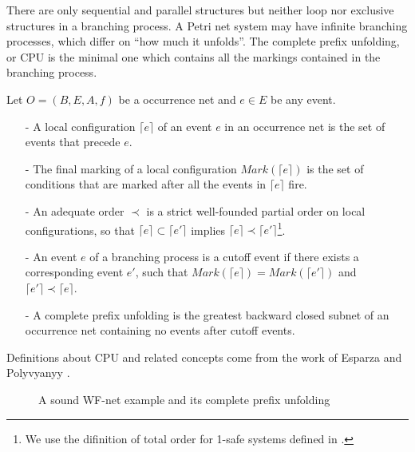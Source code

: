 \documentclass[dvips,...]{llncs}
\begin{document}
There are only sequential and parallel structures but neither loop nor exclusive structures in a branching process. A Petri net system may have infinite branching processes, which differ on ``how much it unfolds''. The complete prefix unfolding, or CPU is the minimal one which contains all the markings contained in the branching process.

\begin{definition}\label{def:cpu}
Let $O=(B,E,A,f)$ be a occurrence net and $e\in E$ be any event.
	\begin{itemize}
		\item[-] A local configuration $\lceil e\rceil$ of an event $e$ in an occurrence net is the set of events that precede $e$.
		\item[-] The final marking of a local configuration $Mark(\lceil e\rceil)$ is the set of conditions that are marked after all the events in $\lceil e\rceil$ fire.
		\item[-] An adequate order $\prec$ is a strict well-founded partial order on local configurations, so that $\lceil e\rceil\subset\lceil e'\rceil$ implies $\lceil e\rceil\prec\lceil e'\rceil$\footnote{We use the difinition of total order for 1-safe systems defined in \cite{esparza1996improvement}.}.
		\item[-] An event $e$ of a branching process is a cutoff event if there exists a corresponding event $e'$, such that $Mark(\lceil e\rceil)=Mark(\lceil e'\rceil)$ and $\lceil e'\rceil\prec\lceil e\rceil$.
		\item[-] A complete prefix unfolding is the greatest backward closed subnet of an occurrence net containing no events after cutoff events.
	\end{itemize}
\end{definition}

Definitions about CPU and related concepts come from the work of Esparza \cite{esparza1996improvement} and Polyvyanyy \cite{polyvyanyy2010structuring}.

\begin{figure}[htbp]
\centering
{}
\caption{A sound WF-net example and its complete prefix unfolding\label{fig:examplePetriAndCpu}}
\end{figure}
\end{document}
